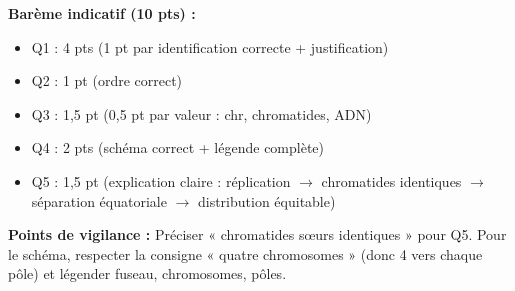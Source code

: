 \documentclass[11pt]{article}
\begin{document}
\begin{corrige}
\textbf{Barème indicatif (10 pts) :}
\begin{itemize}
\item Q1 : 4 pts (1 pt par identification correcte + justification)
\item Q2 : 1 pt (ordre correct)
\item Q3 : 1,5 pt (0,5 pt par valeur : chr, chromatides, ADN)
\item Q4 : 2 pts (schéma correct + légende complète)
\item Q5 : 1,5 pt (explication claire : réplication $\rightarrow$ chromatides identiques $\rightarrow$ séparation équatoriale $\rightarrow$ distribution équitable)
\end{itemize}

\textbf{Points de vigilance :} Préciser « chromatides sœurs identiques » pour Q5. Pour le schéma, respecter la consigne « quatre chromosomes » (donc 4 vers chaque pôle) et légender fuseau, chromosomes, pôles.
\end{corrige}
\end{document}
